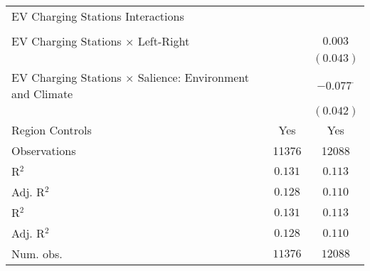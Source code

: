 \begin{center}
\begin{tiny}
\begin{longtable}{l@{} c@{} c@{}}
EV Charging Stations Interactions                                                          &                  &                  \\
                                                                                           &                  &                  \\
\quad EV Charging Stations $\times$ Left-Right                                             &                  & $0.003$          \\
                                                                                           &                  & $(0.043)$        \\
\quad EV Charging Stations $\times$ Salience: Environment and Climate                      &                  & $-0.077^{\cdot}$ \\
                                                                                           &                  & $(0.042)$        \\
\hline
Region Controls                                                                            & Yes              & Yes              \\
Observations                                                                               & 11376            & 12088            \\
R$^2$                                                                                      & $0.131$          & $0.113$          \\
Adj. R$^2$                                                                                 & $0.128$          & $0.110$          \\
R$^2$                                                                                      & $0.131$          & $0.113$          \\
Adj. R$^2$                                                                                 & $0.128$          & $0.110$          \\
Num. obs.                                                                                  & $11376$          & $12088$          \\
\end{longtable}
\end{tiny}
\end{center}
